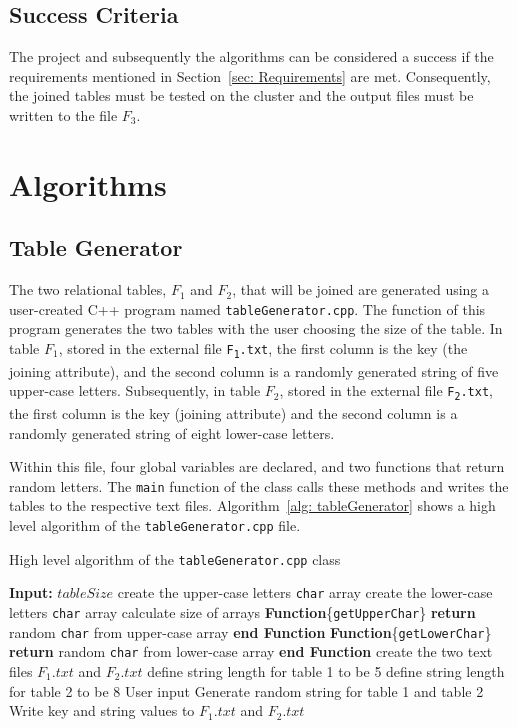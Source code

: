 \documentclass[10pt, conference]{IEEEtran}
\def\code#1{\texttt{#1}}
\begin{document}
\subsection{Success Criteria}
\label{sec: Success Criteria}
The project and subsequently the algorithms can be considered a success if the requirements mentioned in Section~\ref{sec: Requirements} are met. Consequently, the joined tables must be tested on the cluster and the output files must be written to the file $F_3$.

\section{Algorithms}
\label{sec: Algorithms}

\subsection{Table Generator}
\label{section: Table Generator}
The two relational tables, $F_1$ and $F_2$, that will be joined are generated using a user-created C++ program named \code{tableGenerator.cpp}. The function of this program generates the two tables with the user choosing the size of the table. In table $F_1$, stored in the external file \code{F\textsubscript{1}.txt}, the first column is the key (the joining attribute), and the second column is a randomly generated string of five upper-case letters. Subsequently, in table $F_2$, stored in the external file \code{F\textsubscript{2}.txt}, the first column is the key (joining attribute) and the second column is a randomly generated string of eight lower-case letters.

Within this file, four global variables are declared, and two functions that return random letters. The \code{main} function of the class calls these methods and writes the tables to the respective text files. Algorithm~\ref{alg: tableGenerator} shows a high level algorithm of the \code{tableGenerator.cpp} file.

\begin{algorithm}[h!]
\caption{High level algorithm of the \code{tableGenerator.cpp} class}
\label{alg: tableGenerator}
\begin{algorithmic}
\STATE \textbf{Input:} $tableSize$
\STATE
\STATE create the upper-case letters \code{char} array 
\STATE create the lower-case letters \code{char} array
\STATE calculate size of arrays
\STATE
\STATE \textbf{Function}\{\code{getUpperChar}\}
\STATE \qquad \textbf{return} random \code{char} from upper-case array
\STATE \textbf{end Function}
\STATE \textbf{Function}\{\code{getLowerChar}\}
\STATE \qquad \textbf{return} random \code{char} from lower-case array
\STATE \textbf{end Function}
\STATE
\STATE create the two text files $F_1.txt$ and $F_2.txt$
\STATE define string length for table 1 to be 5
\STATE define string length for table 2 to be 8
\STATE User input
\FOR{\code{i = 0} till \code{tableSize}}
	\STATE Generate random string for table 1 and table 2
	\STATE Write key and string values to $F_1.txt$ and $F_2.txt$
\ENDFOR
{}
\end{algorithmic}
\end{algorithm}
\end{document}
